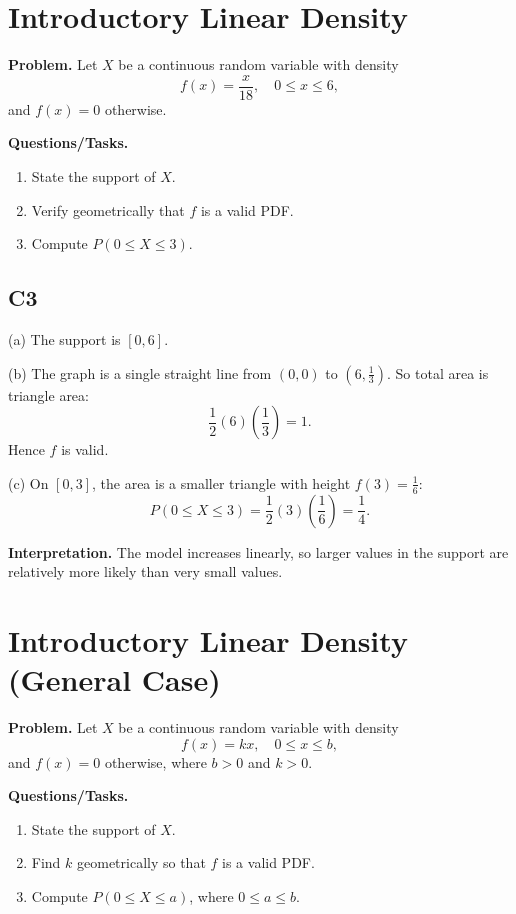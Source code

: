 \section{Introductory Linear Density}

\textbf{Problem.}
Let $X$ be a continuous random variable with density
\[
f(x)=\frac{x}{18},\quad 0\le x\le 6,
\]
and $f(x)=0$ otherwise.

\textbf{Questions/Tasks.}
\begin{enumerate}[label=(\alph*)]
\item State the support of $X$.
\item Verify geometrically that $f$ is a valid PDF.
\item Compute $P(0\le X\le 3)$.
\end{enumerate}

\subsection*{C3}
(a) The support is $[0,6]$.

(b) The graph is a single straight line from $(0,0)$ to $(6,\tfrac13)$.
So total area is triangle area:
\[
\frac12(6)\left(\frac13\right)=1.
\]
Hence $f$ is valid.

(c) On $[0,3]$, the area is a smaller triangle with height $f(3)=\frac16$:
\[
P(0\le X\le 3)=\frac12(3)\left(\frac16\right)=\frac14.
\]

\textbf{Interpretation.}
The model increases linearly, so larger values in the support are relatively more likely than very small values.

\section{Introductory Linear Density (General Case)}

\textbf{Problem.}
Let $X$ be a continuous random variable with density
\[
f(x)=kx,\quad 0\le x\le b,
\]
and $f(x)=0$ otherwise, where $b>0$ and $k>0$.

\textbf{Questions/Tasks.}
\begin{enumerate}[label=(\alph*)]
	\item State the support of $X$.
	\item Find $k$ geometrically so that $f$ is a valid PDF.
	\item Compute $P(0\le X\le a)$, where $0\le a\le b$.
\end{enumerate}

